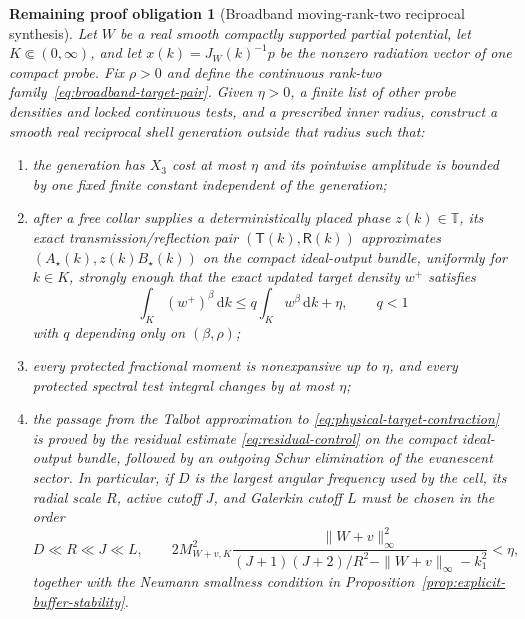 \documentclass[11pt]{article}
\newtheorem{problem}[theorem]{Remaining proof obligation}
\theoremstyle{remark}
\newcommand{\T}{\mathbb T}
\newcommand{\dd}{\,\mathrm d}
\begin{document}
\begin{problem}[Broadband moving-rank-two reciprocal synthesis]
\label{prob:physical}
Let $W$ be a real smooth compactly supported partial potential, let
$K\Subset(0,\infty)$, and let $x(k)=J_W(k)^{-1}p$ be the nonzero radiation
vector of one compact probe.  Fix $\rho>0$ and define the continuous
rank-two family~\eqref{eq:broadband-target-pair}.  Given $\eta>0$, a finite
list of other probe densities and locked continuous tests, and a prescribed
inner radius, construct a smooth real reciprocal shell generation outside
that radius such that:
\begin{enumerate}
 \item the generation has $X_3$ cost at most $\eta$ and its pointwise
 amplitude is bounded by one fixed finite constant independent of the
 generation;
 \item after a free collar supplies a deterministically placed phase
 $z(k)\in\T$, its exact transmission/reflection pair
 $(\mathsf T(k),\mathsf R(k))$ approximates
 $(A_\star(k),z(k)B_\star(k))$ on the compact ideal-output bundle, uniformly
 for $k\in K$, strongly enough that the exact updated target density $w^+$
 satisfies
 \begin{equation}
  \int_K(w^+)^\beta\dd k
  \leq q\int_Kw^\beta\dd k+\eta,
  \qquad q<1
  \label{eq:physical-target-contraction}
 \end{equation}
 with $q$ depending only on $(\beta,\rho)$;
 \item every protected fractional moment is nonexpansive up to $\eta$, and
 every protected spectral test integral changes by at most $\eta$;
 \item the passage from the Talbot approximation to
 \eqref{eq:physical-target-contraction} is proved by the residual estimate
 \eqref{eq:residual-control} on the compact ideal-output bundle, followed by
 an outgoing Schur elimination of the evanescent sector.  In particular, if
 $D$ is the largest angular frequency used by the cell, its radial scale
 $R$, active cutoff $J$, and Galerkin cutoff $L$ must be chosen in the order
 \begin{equation}
  D\ll R\ll J\ll L,
  \qquad
  2M_{W+v,K}^2\frac{\|W+v\|_\infty^2}
  {(J+1)(J+2)/R^2-\|W+v\|_\infty-k_1^2}<\eta,
  \label{eq:physical-buffer-target}
 \end{equation}
 together with the Neumann smallness condition in
 Proposition~\ref{prop:explicit-buffer-stability}.
\end{enumerate}
\end{problem}
\end{document}
